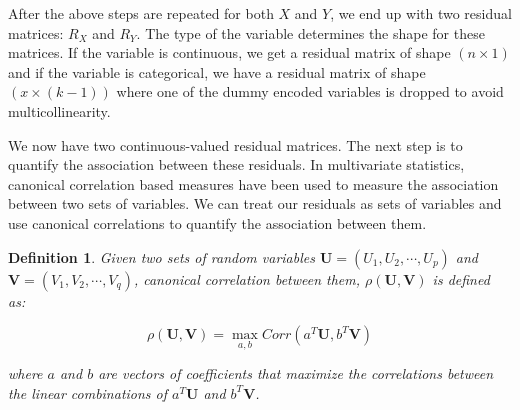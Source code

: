 \documentclass{uai2025} %
\newtheorem{definition}{Definition}
\begin{document}
After the above steps are repeated for both $ X $ and $ Y $, we end up with two
residual matrices: $ R_X $ and $ R_Y $. The type of the variable determines the
shape for these matrices. If the variable is continuous, we get a residual
matrix of shape $ ( n \times 1 ) $ and if the variable is categorical, we have
a residual matrix of shape $ ( x \times (k -1)) $ where one of the dummy encoded
variables is dropped to avoid multicollinearity.

We now have two continuous-valued residual matrices. The next step is
to quantify the association between these residuals. In multivariate
statistics, canonical correlation based measures have been used to measure
the association between two sets of variables. We can treat our residuals
as sets of variables and use canonical correlations to quantify the association
between them.

\begin{definition} 

	Given two sets of random variables $ \bm{U} = (U_1, U_2, \cdots, U_p) $
	and $ \bm{V} = (V_1, V_2, \cdots, V_q) $, canonical correlation between
	them, $\rho(\bm{U}, \bm{V}) $ is defined as:
		

	\begin{equation}
		\rho(\bm{U}, \bm{V}) = \max_{a, b} Corr(a^T \bm{U}, b^T \bm{V})
	\end{equation}

	where $ a $ and $ b $ are vectors of coefficients that maximize the correlations
	between the linear combinations of $ a^T \bm{U} $ and $ b^T \bm{V} $.
\end{definition}

	
\end{document}
